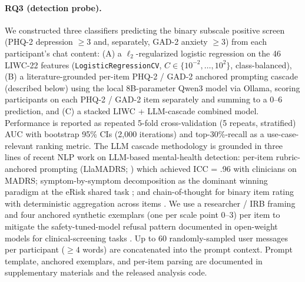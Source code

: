 \documentclass[letterpaper]{article}
\begin{document}
\paragraph{RQ3 (detection probe).} We constructed three classifiers predicting the binary subscale positive screen (PHQ-2 depression $\geq 3$ and, separately, GAD-2 anxiety $\geq 3$) from each participant's chat content: (A) a $\ell_2$-regularized logistic regression on the 46 LIWC-22 features (\texttt{LogisticRegressionCV}, $C \in \{10^{-2},\dots,10^{2}\}$, class-balanced), (B) a literature-grounded per-item PHQ-2 / GAD-2 anchored prompting cascade (described below) using the local 8B-parameter Qwen3 model \citep{qwen3} via Ollama, scoring participants on each PHQ-2 / GAD-2 item separately and summing to a 0--6 prediction, and (C) a stacked LIWC + LLM-cascade combined model. Performance is reported as repeated 5-fold cross-validation (5 repeats, stratified) AUC with bootstrap 95\% CIs (2{,}000 iterations) and top-30\%-recall as a use-case-relevant ranking metric. The LLM cascade methodology is grounded in three lines of recent NLP work on LLM-based mental-health detection: per-item rubric-anchored prompting (LlaMADRS; \citealp{galatzer2025llamadrs}) which achieved ICC = .96 with clinicians on MADRS; symptom-by-symptom decomposition as the dominant winning paradigm at the eRisk shared task \citep{parapar2024erisk,parapar2025erisk}; and chain-of-thought for binary item rating with deterministic aggregation across items \citep{sadeghi2025cognitive}. We use a researcher / IRB framing and four anchored synthetic exemplars (one per scale point 0--3) per item to mitigate the safety-tuned-model refusal pattern documented in open-weight models for clinical-screening tasks \citep{xu2024mentalllm,yang2024mentallama}. Up to 60 randomly-sampled user messages per participant ($\geq 4$ words) are concatenated into the prompt context. Prompt template, anchored exemplars, and per-item parsing are documented in supplementary materials and the released analysis code.
\end{document}
